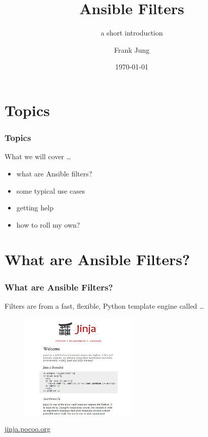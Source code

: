 \documentclass[pdf]{beamer}
\title{Ansible Filters}
\subtitle{a short introduction}
\author{Frank Jung}
\institute{frankhjung@linux.com}
\date{\today}
\begin{document}
\begin{frame}
  \titlepage{}
\end{frame}


\section{Topics}

\begin{frame}
  \frametitle{Topics}
  What we will cover \ldots
  \pause{}
  \begin{itemize}[<+-|alert@+>]
    \item what are Ansible filters?
    \item some typical use cases
    \item getting help
    \item how to roll my own?
  \end{itemize}
\end{frame}

\section{What are Ansible Filters?}

\begin{frame}
  \frametitle{What are Ansible Filters?}
  Filters are from a fast, flexible, Python template engine called \ldots
  \pause{}
  \begin{center}
    \begin{figure}
      \includegraphics[width=0.5\textwidth]{jinja.png}
    \end{figure}
    \href{http://jinja.pocoo.org}{jinja.pocoo.org}
  \end{center}
\end{frame}
\end{document}
